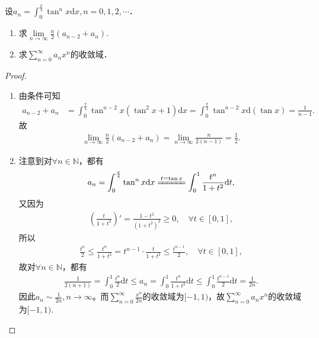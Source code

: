\documentclass[../../main.tex]{subfiles}%
\begin{document}
\begin{example}
设$a_n = \int_0^{\frac{\pi}{4}} \tan^n x \mathrm{d}x, n = 0,1,2,\cdots$．
\begin{enumerate}[(1)]
\item 求$\lim\limits_{n \to \infty} \frac{n}{2}(a_{n-2} + a_n).$

\item 求$\sum\limits_{n=0}^{\infty} a_n x^n$的收敛域．
\end{enumerate}
\end{example}
\begin{proof}
\begin{enumerate}[(1)]
\item 由条件可知
\begin{align*}
a_{n-2} + a_n &= \int_0^{\frac{\pi}{4}} \tan^{n-2}x \left( \tan^2 x + 1 \right) \mathrm{d}x = \int_0^{\frac{\pi}{4}} \tan^{n-2}x \mathrm{d}(\tan x) = \frac{1}{n-1}.
\end{align*}
故
\begin{align*}
\lim_{n \to \infty} \frac{n}{2} \left( a_{n-2} + a_n \right) = \lim_{n \to \infty} \frac{n}{2(n-1)} = \frac{1}{2}.
\end{align*}

\item 注意到对$\forall n\in \mathbb{N}$，都有
\begin{align*}
a_n = \int_0^{\frac{\pi}{4}} \tan^n x \mathrm{d}x \xlongequal{t = \tan x} \int_0^1 \frac{t^n}{1 + t^2} \mathrm{d}t,
\end{align*}
又因为
\begin{align*}
\left( \frac{t}{1 + t^2} \right)' = \frac{1 - t^2}{(1 + t^2)^2} \geqslant 0,\quad \forall t \in [0,1],
\end{align*}
所以
\begin{align*}
\frac{t^n}{2} \leqslant \frac{t^n}{1 + t^2} = t^{n-1} \cdot \frac{t}{1 + t^2} \leqslant \frac{t^{n-1}}{2}, \quad \forall t \in [0,1],
\end{align*}
故对$\forall n\in \mathbb{N}$，都有
\begin{align*}
\frac{1}{2(n+1)} = \int_0^1 \frac{t^n}{2} \mathrm{d}t \leqslant a_n = \int_0^1 \frac{t^n}{1 + t^2} \mathrm{d}t \leqslant \int_0^1 \frac{t^{n-1}}{2} \mathrm{d}t = \frac{1}{2n}.
\end{align*}
因此$a_n \sim \frac{1}{2n}, n \to \infty$。而$\sum\limits_{n=0}^{\infty} \frac{x^n}{2n}$的收敛域为$[-1,1)$，故$\sum\limits_{n=0}^{\infty} a_n x^n$的收敛域为$[-1,1)$.
\end{enumerate}

\end{proof}
\end{document}
